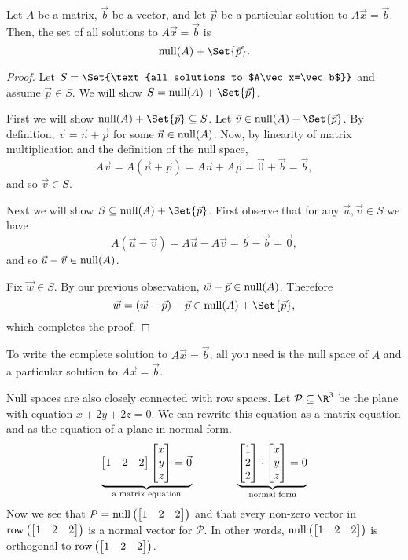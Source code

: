 \begin{theorem}
	Let $A$ be a matrix, $\vec b$ be a vector, and let $\vec p$ be a particular solution
	to $A\vec x=\vec b$. Then, the set of all solutions to $A\vec x=\vec b$ is
	\[
		\Null(A)+\Set{\vec p}.
	\]
\end{theorem}
\begin{proof}
	Let $S=\Set{\text{all solutions to $A\vec x=\vec b$}}$ and assume $\vec p\in S$. We will show $S=\Null(A)+\Set{\vec p}$.

	First we will show $\Null(A)+\Set{\vec p}\subseteq S$. Let $\vec v\in \Null(A)+\Set{\vec p}$. By definition,
	$\vec v=\vec n+\vec p$ for some $\vec n\in \operatorname{null}(A)$. Now, by linearity of matrix multiplication 
	and the definition of the null space,
	\[
		A\vec v=A(\vec n+\vec p)=A\vec n+A\vec p=\vec 0+\vec b=\vec b,
	\]
	and so $\vec v\in S$.

	Next we will show $S\subseteq \Null(A)+\Set{\vec p}$. First observe that for any
	$\vec u,\vec v\in S$ we have
	\[
		A(\vec u-\vec v)=A\vec u-A\vec v=\vec b-\vec b=\vec 0,
	\]
	and so $\vec u-\vec v\in \operatorname{null}(A)$. 
	
	Fix $\vec w\in S$. By our previous observation, $\vec w-\vec p\in \operatorname{null}(A)$. Therefore 
	\[
		\vec w=(\vec w-\vec p)+\vec p\in \Null(A)+\Set{\vec p},
	\]
	which completes the proof.
\end{proof}


\begin{emphbox}[Takeaway]
	To write the complete solution to $A\vec x=\vec b$, all you need is the
	null space of $A$ and a particular solution to $A\vec x=\vec b$.
\end{emphbox}


\bigskip
Null spaces are also closely connected with row spaces. Let $\mathcal P\subseteq \R^3$ be the plane
with equation $x+2y+2z=0$. We can rewrite this equation as a matrix equation and as the equation
of a plane in normal form.
\[
	\underbrace{\mat{1&2&2}\mat{x\\y\\z}=\vec 0}_{\text{a matrix equation}}\qquad\qquad
	\underbrace{\mat{1\\2\\2}\cdot \mat{x\\y\\z}=0}_{\text{normal form}}
\]
Now we see that $\mathcal P=\Null\left(\mat{1&2&2}\right)$ and that every non-zero vector in $\Row\left(\mat{1&2&2}\right)$
is a normal vector for $\mathcal P$. In other words, $\Null\left(\mat{1&2&2}\right)$ is orthogonal to $\Row\left(\mat{1&2&2}\right)$.


